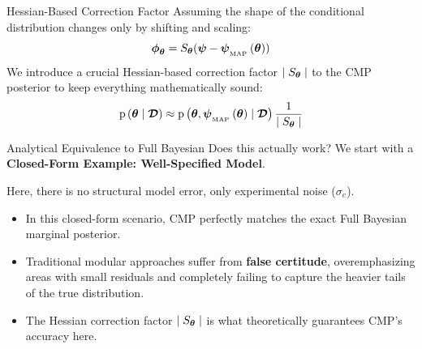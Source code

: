 \begin{frame}{Hessian-Based Correction Factor}
    Assuming the shape of the conditional distribution changes only by shifting and scaling:
    \begin{equation*}
        \boldsymbol{\phi}_{\boldsymbol{\theta}} = S_{\boldsymbol{\theta}} (\boldsymbol{\psi} - \boldsymbol{\psi}_{_\text{MAP}} \left( \boldsymbol{\theta} \right))
    \end{equation*}
    We introduce a crucial Hessian-based correction factor $\mid S_{\boldsymbol{\theta}} \mid$ to the CMP posterior to keep everything mathematically sound:
    \begin{equation*}
        \text{p} \left( \boldsymbol{\theta} \mid \boldsymbol{\mathcal{D}} \right) \approx \text{p} \left( \boldsymbol{\theta}, \boldsymbol{\psi}_{_\text{MAP}} \left( \boldsymbol{\theta} \right) \mid \boldsymbol{\mathcal{D}} \right) \dfrac{1}{\mid S_{\boldsymbol{\theta}} \mid}
    \end{equation*}
    
    \vspace{0.3cm}
    \begin{center}
    \end{center}
\end{frame}

\begin{frame}{Analytical Equivalence to Full Bayesian}
    Does this actually work? We start with a \textbf{Closed-Form Example: Well-Specified Model}.
    \vspace{0.3cm}
    
    Here, there is no structural model error, only experimental noise ($\sigma_e$).
    \begin{itemize}
        \item In this closed-form scenario, CMP perfectly matches the exact Full Bayesian marginal posterior.
        \item Traditional modular approaches suffer from \textbf{false certitude}, overemphasizing areas with small residuals and completely failing to capture the heavier tails of the true distribution.
        \item The Hessian correction factor $\mid S_{\boldsymbol{\theta}} \mid$ is what theoretically guarantees CMP's accuracy here.
    \end{itemize}
\end{frame}


